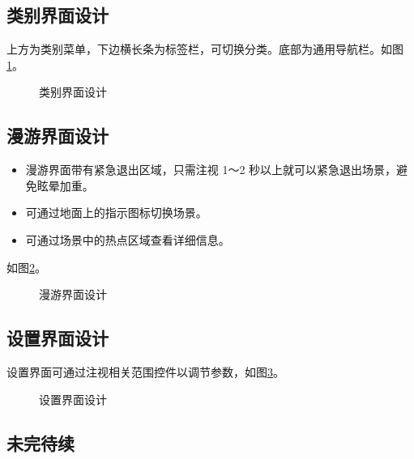 \subsection{类别界面设计}
上方为类别菜单，下边横长条为标签栏，可切换分类。底部为通用导航栏。如图\ref{fig:menu}。

\begin{figure}[htp]
\centering
{}
\caption{类别界面设计}
\label{fig:menu}
\end{figure}

\subsection{漫游界面设计}
\begin{itemize}
	\item 漫游界面带有紧急退出区域，只需注视 1～2 秒以上就可以紧急退出场景，避免眩晕加重。
	\item 可通过地面上的指示图标切换场景。
	\item 可通过场景中的热点区域查看详细信息。
\end{itemize}
如图\ref{fig:scenery}。

\begin{figure}[htp]
\centering
{}
\caption{漫游界面设计}
\label{fig:scenery}
\end{figure}

\subsection{设置界面设计}
设置界面可通过注视相关范围控件以调节参数，如图\ref{fig:setting}。

\begin{figure}[htp]
\centering
{}
\caption{设置界面设计}
\label{fig:setting}
\end{figure}

\subsection{未完待续}